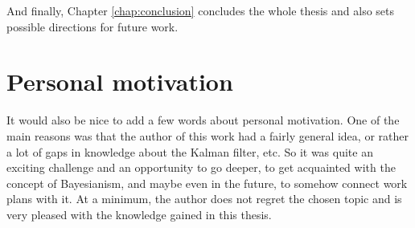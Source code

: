 And finally, Chapter \ref{chap:conclusion} concludes the whole thesis and also sets possible directions for future work.

\section*{Personal motivation}
It would also be nice to add a few words about personal motivation. One of the main reasons was that the author of this work had a fairly general idea, or rather a lot of gaps in knowledge about the Kalman filter, etc. So it was quite an exciting challenge and an opportunity to go deeper, to get acquainted with the concept of Bayesianism, and maybe even in the future, to somehow connect work plans with it. At a minimum, the author does not regret the chosen topic and is very pleased with the knowledge gained in this thesis.